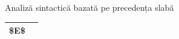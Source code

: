\documentclass[pdf]{beamer}
\begin{document}
\begin{frame}{Analiză sintactică bazată pe precedența slabă}
\begin{minipage}{0.65\textwidth}
\begin{tabular}{p{3cm} p{3cm}}
    \hline
    \hline

    \hline

    \hline
        \$E\$& \\
    \hline
    \hline
    \end{tabular}
\end{minipage}%
\end{frame}
\end{document}
